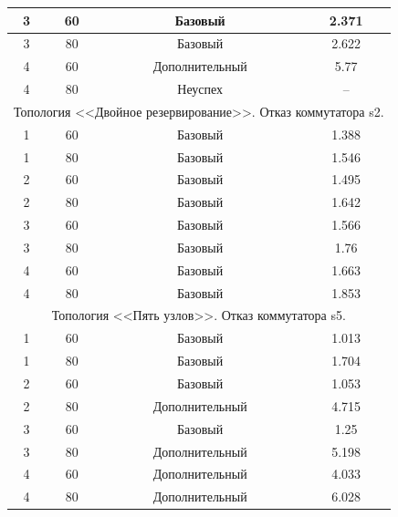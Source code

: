 \documentclass[12pt, a4paper]{article}
\begin{document}
\begin{longtable}[c]{|c|c|c|c|}
		3 & 60 & Базовый & 2.371 \\ \hline
		3 & 80 & Базовый & 2.622 \\ \hline
		4 & 60 & Дополнительный & 5.77 \\ \hline
		4 & 80 & Неуспех & -- \\ \hline
		\multicolumn{4}{|c|}{Топология <<Двойное резервирование>>. Отказ коммутатора s2.} \\ \hline
		1 & 60 & Базовый & 1.388 \\ \hline
		1 & 80 & Базовый & 1.546 \\ \hline
		2 & 60 & Базовый & 1.495 \\ \hline
		2 & 80 & Базовый & 1.642 \\ \hline
		3 & 60 & Базовый & 1.566 \\ \hline
		3 & 80 & Базовый & 1.76 \\ \hline
		4 & 60 & Базовый & 1.663 \\ \hline
		4 & 80 & Базовый & 1.853 \\ \hline
		\multicolumn{4}{|c|}{Топология <<Пять узлов>>. Отказ коммутатора s5.} \\ \hline
		1 & 60 & Базовый & 1.013 \\ \hline
		1 & 80 & Базовый & 1.704 \\ \hline
		2 & 60 & Базовый & 1.053 \\ \hline
		2 & 80 & Дополнительный & 4.715 \\ \hline
		3 & 60 & Базовый & 1.25 \\ \hline
		3 & 80 & Дополнительный & 5.198 \\ \hline
		4 & 60 & Дополнительный & 4.033 \\ \hline
		4 & 80 & Дополнительный & 6.028 \\ \hline
		
\end{longtable}
\end{document}
